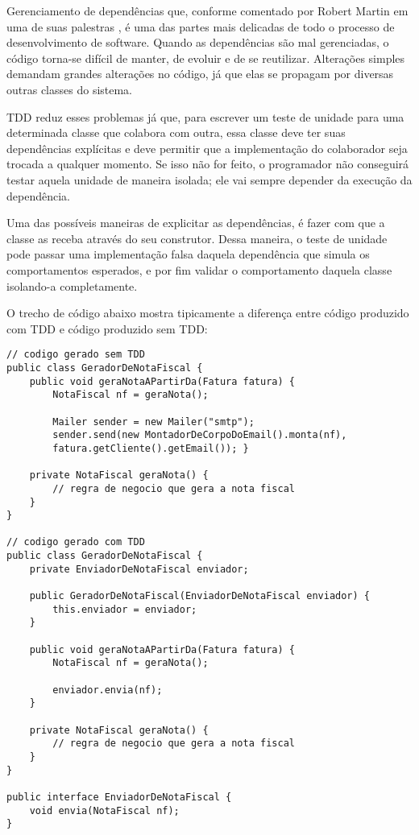 Gerenciamento de dependências que, conforme comentado por Robert Martin em uma
de suas palestras \cite{bobmartin-infoq}, é uma das partes mais delicadas de
todo o processo de desenvolvimento de software. Quando as dependências são mal
gerenciadas, o código torna-se difícil de manter, de evoluir e de se reutilizar.
Alterações simples demandam grandes alterações no código, já que elas se
propagam por diversas outras classes do sistema.

TDD reduz esses problemas já que, para escrever um teste de unidade para uma
determinada classe que colabora com outra, essa classe deve ter suas
dependências explícitas e deve permitir que a implementação do colaborador seja
trocada a qualquer momento. Se isso não for feito, o programador não conseguirá
testar aquela unidade de maneira isolada; ele vai sempre depender da execução da
dependência.

Uma das possíveis maneiras de explicitar as dependências, é fazer com que a
classe as receba através do seu construtor. Dessa maneira, o teste de unidade
pode passar uma implementação falsa daquela dependência que simula os
comportamentos esperados, e por fim validar o comportamento daquela classe
isolando-a completamente.

O trecho de código abaixo mostra tipicamente a diferença entre código produzido
com TDD e código produzido sem TDD:

\begin{lstlisting}[frame=trbl]
// codigo gerado sem TDD
public class GeradorDeNotaFiscal {
	public void geraNotaAPartirDa(Fatura fatura) {
		NotaFiscal nf = geraNota(); 
		
		Mailer sender = new Mailer("smtp");
		sender.send(new MontadorDeCorpoDoEmail().monta(nf),
		fatura.getCliente().getEmail()); }
	
	private NotaFiscal geraNota() {
		// regra de negocio que gera a nota fiscal
	}
}

// codigo gerado com TDD
public class GeradorDeNotaFiscal {
	private EnviadorDeNotaFiscal enviador;
	
	public GeradorDeNotaFiscal(EnviadorDeNotaFiscal enviador) {
		this.enviador = enviador;
	}
	
	public void geraNotaAPartirDa(Fatura fatura) {
		NotaFiscal nf = geraNota(); 
		
		enviador.envia(nf);
	}
	
	private NotaFiscal geraNota() {
		// regra de negocio que gera a nota fiscal
	}
}

public interface EnviadorDeNotaFiscal {
	void envia(NotaFiscal nf);
}
\end{lstlisting}

